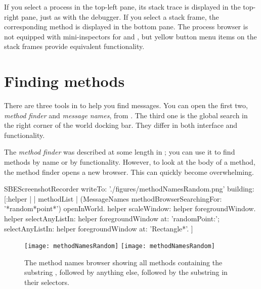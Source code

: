 \documentclass[a4paper,10pt,twoside]{book}
\begin{document}
If you select a process in the top-left pane, its stack trace is displayed in the top-right pane, just as with the debugger.
If you select a stack frame, the corresponding method is displayed in the bottom pane.
The process browser is not equipped with mini-inspectors for \self and , but yellow button menu items on the stack frames provide equivalent functionality.



\section{Finding methods}
\label{sec:methodFinder}

There are three tools in \sq to help you find messages. You can open the first two, \emph{method finder} and \emph{message names}, from . The third one is the global search in the right corner of the world docking bar.
They differ in both interface and functionality.

The \emph{method finder} was described at some length in ; you can use it to find methods by name or by functionality.
However, to look at the body of a method, the method finder opens a new browser.
This can quickly become overwhelming.

\begin{ExecuteSmalltalkScript}
SBEScreenshotRecorder writeTo: './figures/methodNamesRandom.png' building: [:helper |
	| methodList |
	(MessageNames methodBrowserSearchingFor: '*random*point*') openInWorld.
	helper scaleWindow: helper foregroundWindow.
	helper
		selectAnyListIn: helper foregroundWindow at: 'randomPoint:';
		selectAnyListIn: helper foregroundWindow at: 'Rectangle*'.
]
\end{ExecuteSmalltalkScript}
\begin{figure}[btp]
	\begin{center}
	\ifluluelse
		{\texttt{[image: methodNamesRandom]}}
		{\texttt{[image: methodNamesRandom]}}
	\end{center}
	\caption{The method names browser showing all methods containing the substring , followed by anything else, followed by the substring  in their selectors.}
	\label{fig:methodNamesRandom}
\end{figure}
\end{document}
